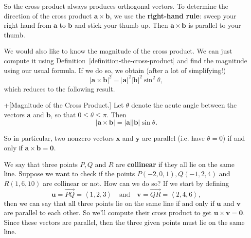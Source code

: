 \documentclass[10pt,]{book}
\newcommand{\terminology}[1]{\textbf{#1}}
\theoremstyle{ptxplainnotitle}
\theoremstyle{ptxplaintitle}
\theoremstyle{ptxplainnotitle}
\theoremstyle{ptxplaintitle}
\theoremstyle{ptxplainnotitle}
\theoremstyle{ptxplaintitle}
\theoremstyle{ptxdefinitionnotitle}
\theoremstyle{ptxdefinitiontitle}
\theoremstyle{ptxdefinitionnotitle}
\theoremstyle{ptxdefinitiontitle}
\theoremstyle{ptxdefinitionnotitle}
\theoremstyle{ptxdefinitiontitle}
\theoremstyle{ptxdefinitionnotitle}
\theoremstyle{ptxdefinitiontitle}
\theoremstyle{ptxdefinitionnotitle}
\theoremstyle{ptxdefinitiontitle}
\numberwithin{equation}{section}
\newcommand{\vv}[1]{\mathbf{#1}}
\newcommand{\dotprod}[1]{\left\langle #1 \right\rangle}
\begin{document}
\hypertarget{p-831}{}%
So the cross product always produces orthogonal vectors. To determine the direction of the cross product \(\vv{a}\times\vv{b}\), we use the \terminology{right-hand rule}: sweep your right hand from \(\vv{a}\) to \(\vv{b}\) and stick your thumb up. Then \(\vv{a}\times\vv{b}\) is parallel to your thumb.%
\par
\hypertarget{p-832}{}%
We would also like to know the magnitude of the cross product. We can just compute it using \hyperref[definition-the-cross-product]{Definition~\ref{definition-the-cross-product}} and find the magnitude using our usual formula. If we do so, we obtain (after a lot of simplifying!)%
%
\begin{equation*}
|\vv{a}\times\vv{b}|^{2} = |\vv{a}|^{2}|\vv{b}|^{2}\sin^{2}\theta,
\end{equation*}
\hypertarget{p-833}{}%
which reduces to the following result.%
\begin{theorem}+[{Magnitude of the Cross Product.}]\label{theorem-magnitude-of-the-cross-product}
\hypertarget{p-834}{}%
Let \(\theta\) denote the acute angle between the vectors \(\vv{a}\) and \(\vv{b}\), so that \(0\leq\theta\leq\pi\). Then%
%
\begin{equation*}
|\vv{a}\times\vv{b}| = |\vv{a}||\vv{b}|\sin\theta.
\end{equation*}
\end{theorem}
\hypertarget{p-835}{}%
So in particular, two nonzero vectors \(\vv{x}\) and \(\vv{y}\) are parallel (i.e. have \(\theta=0\)) if and only if \(\vv{a}\times\vv{b} = \vv{0}\).%
\begin{example}\label{example-testing-collinearity}
\hypertarget{p-836}{}%
We say that three points \(P,Q\) and \(R\) are \terminology{collinear} if they all lie on the same line. Suppose we want to check if the points \(P(-2,0,1), Q(-1,2,4)\) and \(R(1,6,10)\) are collinear or not. How can we do so? If we start by defining%
%
\begin{equation*}
\vv{u} = \vec{PQ} = \dotprod{1,2,3}\quad\text{and}\quad \vv{v} = \vec{QR} = \dotprod{2,4,6},
\end{equation*}
\hypertarget{p-837}{}%
then we can say that all three points lie on the same line if and only if \(\vv{u}\) and \(\vv{v}\) are parallel to each other. So we'll compute their cross product to get \(\vv{u}\times\vv{v} = \vv{0}\). Since these vectors are parallel, then the three given points must lie on the same line.%
\end{example}
\end{document}
